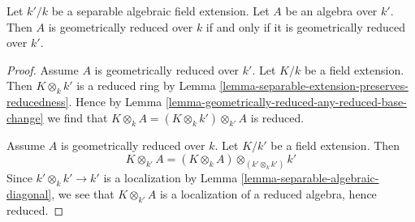 \begin{lemma}
\label{lemma-geometrically-reduced-over-separable-algebraic}
Let $k'/k$ be a separable algebraic field extension.
Let $A$ be an algebra over $k'$. Then $A$ is geometrically
reduced over $k$ if and only if it is geometrically reduced over $k'$.
\end{lemma}

\begin{proof}
Assume $A$ is geometrically reduced over $k'$.
Let $K/k$ be a field extension. Then $K \otimes_k k'$ is
a reduced ring by
Lemma \ref{lemma-separable-extension-preserves-reducedness}.
Hence by Lemma \ref{lemma-geometrically-reduced-any-reduced-base-change}
we find that $K \otimes_k A = (K \otimes_k k') \otimes_{k'} A$ is reduced.

\medskip\noindent
Assume $A$ is geometrically reduced over $k$. Let $K/k'$ be a field
extension. Then
$$
K \otimes_{k'} A = (K \otimes_k A) \otimes_{(k' \otimes_k k')} k'
$$
Since $k' \otimes_k k' \to k'$ is a localization by
Lemma \ref{lemma-separable-algebraic-diagonal},
we see that $K \otimes_{k'} A$
is a localization of a reduced algebra, hence reduced.
\end{proof}





